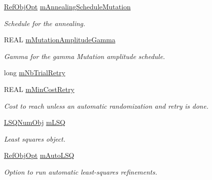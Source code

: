\begin{DoxyCompactItemize}
\mbox{\label{class_obj_cryst_1_1_monte_carlo_obj_a5bb4e03ae2221be34131f4c0f108271e}} 
\mbox{\hyperlink{class_obj_cryst_1_1_ref_obj_opt}{Ref\+Obj\+Opt}} \mbox{\hyperlink{class_obj_cryst_1_1_monte_carlo_obj_a5bb4e03ae2221be34131f4c0f108271e}{m\+Annealing\+Schedule\+Mutation}}
\begin{DoxyCompactList}\small\item\em Schedule for the annealing. \end{DoxyCompactList}\item 
\mbox{\label{class_obj_cryst_1_1_monte_carlo_obj_a1cfbd1b4fc984a06a02c5102a9dcfcd3}} 
R\+E\+AL \mbox{\hyperlink{class_obj_cryst_1_1_monte_carlo_obj_a1cfbd1b4fc984a06a02c5102a9dcfcd3}{m\+Mutation\+Amplitude\+Gamma}}
\begin{DoxyCompactList}\small\item\em Gamma for the \textquotesingle{}gamma\textquotesingle{} Mutation amplitude schedule. \end{DoxyCompactList}\item 
long \mbox{\hyperlink{class_obj_cryst_1_1_monte_carlo_obj_a22e972f1cb525f9dc5336fd1f47fa93b}{m\+Nb\+Trial\+Retry}}
\item 
\mbox{\label{class_obj_cryst_1_1_monte_carlo_obj_a9a45d65ee6522c4dc159a91fdb4c1661}} 
R\+E\+AL \mbox{\hyperlink{class_obj_cryst_1_1_monte_carlo_obj_a9a45d65ee6522c4dc159a91fdb4c1661}{m\+Min\+Cost\+Retry}}
\begin{DoxyCompactList}\small\item\em Cost to reach unless an automatic randomization and retry is done. \end{DoxyCompactList}\item 
\mbox{\label{class_obj_cryst_1_1_monte_carlo_obj_a36b4c13151172e24108d6578d63d1125}} 
\mbox{\hyperlink{class_obj_cryst_1_1_l_s_q_num_obj}{L\+S\+Q\+Num\+Obj}} \mbox{\hyperlink{class_obj_cryst_1_1_monte_carlo_obj_a36b4c13151172e24108d6578d63d1125}{m\+L\+SQ}}
\begin{DoxyCompactList}\small\item\em Least squares object. \end{DoxyCompactList}\item 
\mbox{\label{class_obj_cryst_1_1_monte_carlo_obj_a3d6e159362a2f93d5a2883e60f1710d8}} 
\mbox{\hyperlink{class_obj_cryst_1_1_ref_obj_opt}{Ref\+Obj\+Opt}} \mbox{\hyperlink{class_obj_cryst_1_1_monte_carlo_obj_a3d6e159362a2f93d5a2883e60f1710d8}{m\+Auto\+L\+SQ}}
\begin{DoxyCompactList}\small\item\em Option to run automatic least-\/squares refinements. \end{DoxyCompactList}\end{DoxyCompactItemize}


